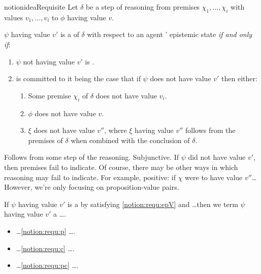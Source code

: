 \begin{note}

  \begin{restatable}[A \requ{0}]{notion}{ideaRequisite}
    Let \(\delta\) be a step of reasoning from premises \(\chi_{1},\dots,\chi_{i}\) with values \(v_{1},\dots,v_{i}\) to \(\phi\) having value \(v\).

    \(\psi\) having value \(v'\) is a \requ{} of \(\delta\) with respect to an agent \vAgent{}' epistemic state \emph{if and only if}:
    \begin{enumerate}[label=\circledR\arabic*., ref=(\circledR\arabic*)]
    \item
      \label{notion:requ:epV}
      \(\psi\) not having value \(v'\) is \epV{}.
    \item \vAgent{} is committed to it being the case that if \(\psi\) does not have value \(v'\) then either:
      \begin{enumerate}[label=\alph*., ref=(\circledR2\alph*)]
      \item
        \label{notion:requ:p}
        Some premise \(\chi_{i}\) of \(\delta\) does not have value \(v_{i}\).
      \item
        \label{notion:requ:c}
        \(\phi\) does not have value \(v\).
      \item
        \label{notion:requ:pc}
        \(\xi\) does not have value \(v''\), where \(\xi\) having value \(v''\) follows from the premises of \(\delta\) when combined with the conclusion of \(\delta\).
      \end{enumerate}
    \end{enumerate}
  \end{restatable}

  Follows from some step of the reasoning.
  Subjunctive.
  If \(\psi\) did not have value \(v'\), then premises fail to indicate.
  Of course, there may be other ways in which reasoning may fail to indicate.
  For example, positive: if \(\chi\) were to have value \(v''\)\dots
  However, we're only focusing on proposition-value pairs.
\end{note}

\begin{note}
  If \(\psi\) having value \(v'\) is a \requ{} by satisfying \ref{notion:requ:epV} and \dots\space then we term \(\psi\) having value \(v'\) a \dots\space.
  \begin{itemize}
  \item \dots\space \ref{notion:requ:p} \dots\space \prequ{}.
  \item \dots\space \ref{notion:requ:c} \dots\space \crequ{}.
  \item \dots\space \ref{notion:requ:pc} \dots\space \cprequ{}.
  \end{itemize}
\end{note}

